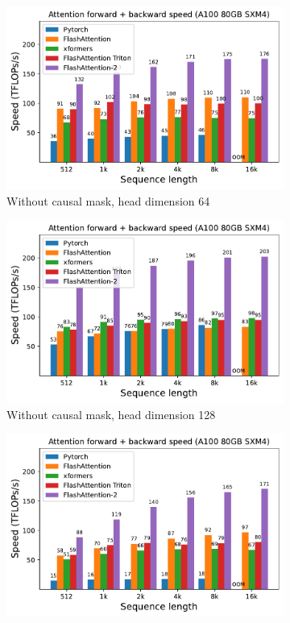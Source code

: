 \begin{figure}[ht]
  \centering
  \begin{subfigure}{.5\textwidth}
    \centering
    \includegraphics[width=.95\linewidth]{figs/flash2_causal_False_hdim_64_fwd_bwd_speed.pdf}
    \caption{Without causal mask, head dimension 64}
  \end{subfigure}%
  \begin{subfigure}{.5\textwidth}
    \centering
    \includegraphics[width=.95\linewidth]{figs/flash2_causal_False_hdim_128_fwd_bwd_speed.pdf}
    \caption{Without causal mask, head dimension 128}
  \end{subfigure}
  \begin{subfigure}{.5\textwidth}
    \centering
    \includegraphics[width=.95\linewidth]{figs/flash2_causal_True_hdim_64_fwd_bwd_speed.pdf}

\end{subfigure}
\end{figure}

